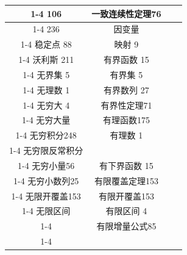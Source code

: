 \begin{center}
{\begin{tabular}{|c|c|c|c|}
\cline{1-4}
106 & 一致连续性定理76 & \phantom{X} & \phantom{X} \\
\cline{1-4}
236 & 因变量 & \phantom{X} & \phantom{X} \\
\cline{1-4}
稳定点 88 & 映射 9 & \phantom{X} & \phantom{X} \\
\cline{1-4}
沃利斯 211 & 有界函数 15 & \phantom{X} & \phantom{X} \\
\cline{1-4}
无界集 5 & 有界集 5 & \phantom{X} & \phantom{X} \\
\cline{1-4}
无理数 1 & 有界数列 27 & \phantom{X} & \phantom{X} \\
\cline{1-4}
无穷大 4 & 有界性定理71 & \phantom{X} & \phantom{X} \\
\cline{1-4}
无穷大量 & 有理函数175 & \phantom{X} & \phantom{X} \\
\cline{1-4}
无穷积分248 & 有理数 1 & \phantom{X} & \phantom{X} \\
\cline{1-4}
无穷限反常积分 & \phantom{X} & \phantom{X} & \phantom{X} \\
\cline{1-4}
无穷小量56 & 有下界函数 15 & \phantom{X} & \phantom{X} \\
\cline{1-4}
无穷小数列25 & 有限覆盖定理153 & \phantom{X} & \phantom{X} \\
\cline{1-4}
无限开覆盖153 & 有限开覆盖153 & \phantom{X} & \phantom{X} \\
\cline{1-4}
无限区间 & 有限区间 4 & \phantom{X} & \phantom{X} \\
\cline{1-4}
\phantom{X} & 有限增量公式85 & \phantom{X} & \phantom{X} \\
\cline{1-4}
\hline
\end{tabular}
}
\end{center}

\begin{center}
\end{center}

